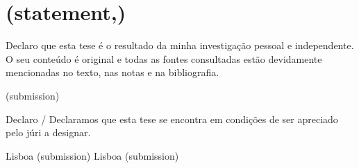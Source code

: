 \makeatletter

\chapter{\GetBkmString(statement,\@LANG@MAIN)}

\vfill

Declaro que esta tese é o resultado da minha investigação pessoal e independente.
O seu conteúdo é original e todas as fontes consultadas estão devidamente mencionadas no
texto, nas notas e na bibliografia.

 {\GetDocDate(submission)}


\vfill


Declaro / Declaramos que esta tese se encontra em condições de ser apreciado pelo júri a designar.

 {Lisboa} {\GetDocDate(submission)}
 {Lisboa} {\GetDocDate(submission)}

\vfill\null

\makeatother
